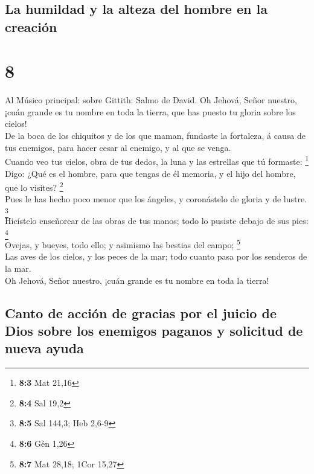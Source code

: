 \hypertarget{la-humildad-y-la-alteza-del-hombre-en-la-creaciuxf3n}{%
\subsection{La humildad y la alteza del hombre en la
creación}\label{la-humildad-y-la-alteza-del-hombre-en-la-creaciuxf3n}}

\hypertarget{section-7}{%
\section{8}\label{section-7}}

 Al Músico principal: sobre Gittith: Salmo de David. Oh
Jehová, Señor nuestro, ¡cuán grande es tu nombre en toda la tierra, que
has puesto tu gloria sobre los cielos!\\
 De la boca de los chiquitos y de los que maman, fundaste
la fortaleza, á causa de tus enemigos, para hacer cesar al enemigo, y al
que se venga.\\
 Cuando veo tus cielos, obra de tus dedos, la luna y las
estrellas que tú formaste: \footnote{\textbf{8:3} Mat 21,16}\\
 Digo: ¿Qué es el hombre, para que tengas de él memoria, y
el hijo del hombre, que lo visites? \footnote{\textbf{8:4} Sal 19,2}\\
 Pues le has hecho poco menor que los ángeles, y
coronástelo de gloria y de lustre. \footnote{\textbf{8:5} Sal 144,3; Heb
  2,6-9}\\
 Hicístelo enseñorear de las obras de tus manos; todo lo
pusiste debajo de sus pies: \footnote{\textbf{8:6} Gén 1,26}\\
 Ovejas, y bueyes, todo ello; y asimismo las bestias del
campo; \footnote{\textbf{8:7} Mat 28,18; 1Cor 15,27}\\
 Las aves de los cielos, y los peces de la mar; todo
cuanto pasa por los senderos de la mar.\\
 Oh Jehová, Señor nuestro, ¡cuán grande es tu nombre en
toda la tierra!

\hypertarget{canto-de-acciuxf3n-de-gracias-por-el-juicio-de-dios-sobre-los-enemigos-paganos-y-solicitud-de-nueva-ayuda}{%
\subsection{Canto de acción de gracias por el juicio de Dios sobre los
enemigos paganos y solicitud de nueva
ayuda}\label{canto-de-acciuxf3n-de-gracias-por-el-juicio-de-dios-sobre-los-enemigos-paganos-y-solicitud-de-nueva-ayuda}}

